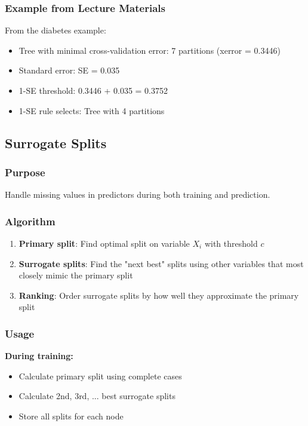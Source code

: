 \documentclass[12pt,a4paper]{article}
\begin{document}
\subsubsection{Example from Lecture Materials}

From the diabetes example:
\begin{itemize}
    \item Tree with minimal cross-validation error: 7 partitions (xerror = 0.3446)
    \item Standard error: SE = 0.035
    \item 1-SE threshold: 0.3446 + 0.035 = 0.3752
    \item 1-SE rule selects: Tree with 4 partitions
\end{itemize}

\subsection{Surrogate Splits}

\subsubsection{Purpose}

Handle missing values in predictors during both training and prediction.

\subsubsection{Algorithm}

\begin{enumerate}
    \item \textbf{Primary split}: Find optimal split on variable $X_i$ with threshold $c$
    \item \textbf{Surrogate splits}: Find the "next best" splits using other variables that most closely mimic the primary split
    \item \textbf{Ranking}: Order surrogate splits by how well they approximate the primary split
\end{enumerate}

\subsubsection{Usage}

\textbf{During training:}
\begin{itemize}
    \item Calculate primary split using complete cases
    \item Calculate 2nd, 3rd, ... best surrogate splits
    \item Store all splits for each node
\end{itemize}
\end{document}
